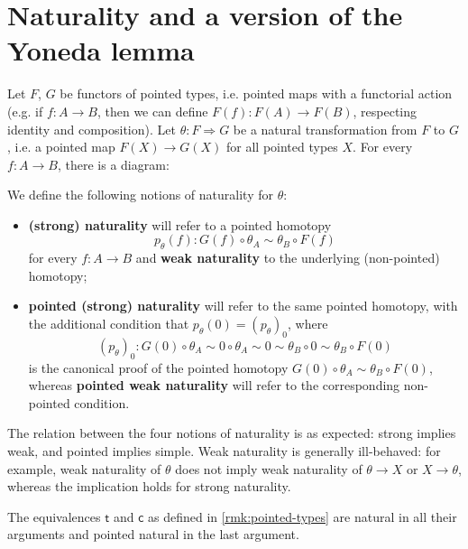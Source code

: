 \documentclass{article}
\renewcommand{\o}{\ensuremath{\circ}}
\newcommand{\two}{\mathsf{t}}
\newcommand{\twist}{\mathsf{c}}
\begin{document}
\section{Naturality and a version of the Yoneda lemma}

\begin{defn}\label{def:naturality}
	Let $F$, $G$ be functors of pointed types, i.e. pointed maps with a functorial action (e.g. if $f : A \to B$, then we can define $F(f) : F(A) \to F(B)$, respecting identity and composition). 
	Let $\theta : F \Rightarrow G$ be a natural transformation from $F$ to $G$, i.e. a pointed map $F(X) \to G(X)$ for all pointed types $X$. For every $f : A \to B$, there is a diagram:
	\begin{center}
	\end{center}
	We define the following notions of naturality for $\theta$:
	\begin{itemize}
		\item \textbf{(strong) naturality} will refer to a pointed homotopy
		\[p_\theta(f) : G(f) \o \theta_A \sim \theta_B \o F(f)\]
		for every $f : A \to B$ and \textbf{weak naturality} to the underlying (non-pointed) homotopy;
		\item \textbf{pointed (strong) naturality} will refer to the same pointed homotopy, with the additional condition that $p_\theta(0) = (p_\theta)_0$, where
		\[(p_\theta)_0 : G(0) \o \theta_A \sim 0 \o \theta_A \sim 0 \sim \theta_B \o 0 \sim \theta_B \o F(0)\]
		is the canonical proof of the pointed homotopy $G(0) \o \theta_A \sim \theta_B \o F(0)$, whereas \textbf{pointed weak naturality} will refer to the corresponding non-pointed condition.
	\end{itemize}
\end{defn}

\begin{rmk}
	The relation between the four notions of naturality is as expected: strong implies weak, and pointed implies simple. Weak naturality is generally ill-behaved: for example, weak naturality of $\theta$ does not imply weak naturality of $\theta \to X$ or $X \to \theta$, whereas the implication holds for strong naturality.
\end{rmk}

\begin{rmk}
	The equivalences $\two$ and $\twist$ as defined in \autoref{rmk:pointed-types} are natural in all their arguments and pointed natural in the last argument.
\end{rmk}
\end{document}
